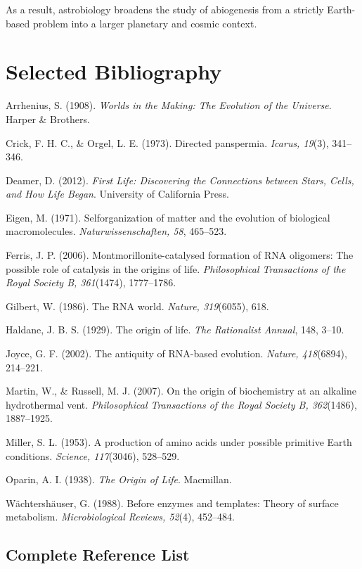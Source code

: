 \documentclass[
  oneside]{book}
\begin{document}
As a result, astrobiology broadens the study of abiogenesis from a strictly Earth-based problem into a larger planetary and cosmic context.

\chapter{Selected Bibliography}\label{selected-bibliography}

Arrhenius, S. (1908). \emph{Worlds in the Making: The Evolution of the Universe}. Harper \& Brothers.

Crick, F. H. C., \& Orgel, L. E. (1973). Directed panspermia. \emph{Icarus, 19}(3), 341--346.

Deamer, D. (2012). \emph{First Life: Discovering the Connections between Stars, Cells, and How Life Began}. University of California Press.

Eigen, M. (1971). Selforganization of matter and the evolution of biological macromolecules. \emph{Naturwissenschaften, 58}, 465--523.

Ferris, J. P. (2006). Montmorillonite-catalysed formation of RNA oligomers: The possible role of catalysis in the origins of life. \emph{Philosophical Transactions of the Royal Society B, 361}(1474), 1777--1786.

Gilbert, W. (1986). The RNA world. \emph{Nature, 319}(6055), 618.

Haldane, J. B. S. (1929). The origin of life. \emph{The Rationalist Annual}, 148, 3--10.

Joyce, G. F. (2002). The antiquity of RNA-based evolution. \emph{Nature, 418}(6894), 214--221.

Martin, W., \& Russell, M. J. (2007). On the origin of biochemistry at an alkaline hydrothermal vent. \emph{Philosophical Transactions of the Royal Society B, 362}(1486), 1887--1925.

Miller, S. L. (1953). A production of amino acids under possible primitive Earth conditions. \emph{Science, 117}(3046), 528--529.

Oparin, A. I. (1938). \emph{The Origin of Life}. Macmillan.

Wächtershäuser, G. (1988). Before enzymes and templates: Theory of surface metabolism. \emph{Microbiological Reviews, 52}(4), 452--484.

\section{Complete Reference List}\label{complete-reference-list}
\end{document}
